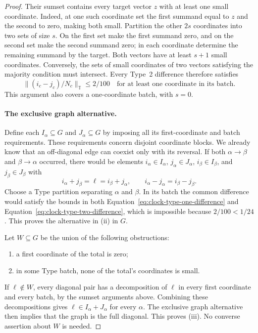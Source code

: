 \begin{proof}
Their sumset contains every target vector $z$ with at least one small
coordinate.  Indeed, at one such coordinate set the first summand equal
to $z$ and the second to zero, making both small.  Partition the other
$2s$ coordinates into two sets of size $s$.  On the first set make the
first summand zero, and on the second set make the second summand zero;
in each coordinate determine the remaining summand by the target.
Both vectors have at least $s+1$ small coordinates.  Conversely, the
sets of small coordinates of two vectors satisfying the majority
condition must intersect.  Every Type~2 difference therefore satisfies
\begin{equation}
 \|(i_c-j_c)/N_c\|_{\mathbb T}\le2/100
 \quad\text{for at least one coordinate in its batch}.
 \label{eq:clock-type-two-difference}
\end{equation}
This argument also covers a one-coordinate batch, with $s=0$.

\paragraph{The exclusive graph alternative.}
Define each $I_\alpha\subseteq G$ and $J_\alpha\subseteq G$ by imposing
all its first-coordinate and batch requirements.  These requirements
concern disjoint coordinate blocks.  We already know that an
off-diagonal edge can coexist only with its reversal.  If both
$\alpha\to\beta$ and $\beta\to\alpha$ occurred, there would be elements
$i_\alpha\in I_\alpha$, $j_\alpha\in J_\alpha$,
$i_\beta\in I_\beta$, and $j_\beta\in J_\beta$ with
\[
 i_\alpha+j_\beta=\ell=i_\beta+j_\alpha,
 \qquad i_\alpha-j_\alpha=i_\beta-j_\beta.
\]
Choose a Type partition separating $\alpha$ and $\beta$.  In its batch
the common difference would satisfy the bounds in both
Equation~\eqref{eq:clock-type-one-difference} and
Equation~\eqref{eq:clock-type-two-difference}, which is impossible because
$2/100<1/24$.  This proves the alternative in \textup{(ii)} in $G$.

Let $W\subseteq G$ be the union of the following obstructions:
\begin{enumerate}[label=\textup{(\alph*)}]
\item a first coordinate of the total is zero;
\item in some Type batch, none of the total's coordinates is small.
\end{enumerate}
If $\ell\notin W$, every diagonal pair has a decomposition of $\ell$
in every first coordinate and every batch, by the sumset arguments
above.  Combining these decompositions gives
$\ell\in I_\alpha+J_\alpha$ for every $\alpha$.  The exclusive graph
alternative then implies that the graph is the full diagonal.  This
proves \textup{(iii)}.  No converse assertion about $W$ is needed.


\end{proof}
